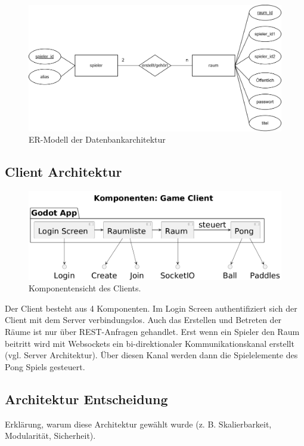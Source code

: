 \documentclass[
]{article}
\begin{document}
\begin{figure}[H]
	\centering
	\includegraphics[width=\textwidth ]{resources/ER-Modell.png}
	\caption{ER-Modell der Datenbankarchitektur}
	\label{fig:ER-Modell}
\end{figure}

\subsection{Client Architektur}
\begin{figure}[H]
	\centering
	\includegraphics[width=\textwidth -80pt ]{resources/Client-Architektur.png}
	\caption{Komponentensicht des Clients.}
	\label{fig:clientarchitektur}
\end{figure}
Der Client besteht aus 4 Komponenten. Im Login Screen authentifiziert sich der Client mit dem Server verbindungslos. Auch das Erstellen und Betreten der Räume ist nur über REST-Anfragen gehandlet. Erst wenn ein Spieler den Raum beitritt wird mit Websockets ein bi-direktionaler Kommunikationskanal erstellt (vgl. Server Architektur). Über diesen Kanal werden dann die Spielelemente des Pong Spiels gesteuert. 


\hypertarget{section-achitactural-decision}{
\subsection{Architektur Entscheidung}}
Erklärung, warum diese Architektur gewählt wurde (z. B. Skalierbarkeit, Modularität, Sicherheit).
\end{document}
